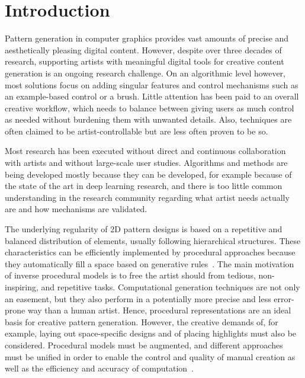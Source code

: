 \section{Introduction}
Pattern generation in computer graphics provides vast amounts of precise and aesthetically pleasing digital content. However, despite over three decades of research, supporting artists with meaningful digital tools for creative content generation is an ongoing research challenge. On an algorithmic level however, most solutions focus on adding singular features and control mechanisms such as an example-based control or a brush. Little attention has been paid to an overall creative workflow, which needs to balance between giving users as much control as needed without burdening them with unwanted details. Also, techniques are often claimed to be artist-controllable but are less often proven to be so.

Most research has been executed without direct and continuous collaboration with artists and without large-scale user studies. Algorithms and methods are being developed mostly because they can be developed, for example because of the state of the art in deep learning research, and there is too little common understanding in the research community regarding what artist needs actually are and how mechanisms are validated.

The underlying regularity of 2D pattern designs is based on a repetitive and balanced distribution of elements, usually following hierarchical structures. These characteristics can be efficiently implemented by procedural approaches because they automatically fill a space based on generative rules~\cite{stava_2010_ipm}. The main motivation of inverse procedural models is to free the artist should from tedious, non-inspiring, and repetitive tasks. Computational generation techniques are not only an easement, but they also perform in a potentially more precise and less error-prone way than a human artist. Hence, procedural representations are an ideal basis for creative pattern generation. 
However, the creative demands of, for example, laying out space-specific designs and of placing highlights must also be considered. Procedural models must be augmented, and different approaches must be unified in order to enable the control and quality of manual creation as well as the efficiency and accuracy of computation~\cite{gieseke_2017_ooo}. 

